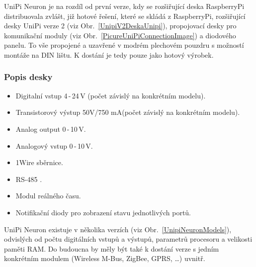UniPi Neuron je na rozdíl od první verze, kdy se rozšiřující deska RaspberryPi distribuovala zvlášt, již hotové řešení, které se skládá z RaspberryPi, rozšiřující desky UniPi verze 2 (viz Obr.~\ref{UnipiV2DeskaUnipi}), propojovací desky pro komunikační moduly (viz Obr.~\ref{PicureUniPiConnectionImage}) a diodového panelu. To vše propojené a uzavřené v modrém plechovém pouzdru s možností montáže na DIN lištu. K dostání je tedy pouze jako hotový výrobek.


\subsubsection{Popis desky}
\begin{itemize}
\item Digitalní vstup 4\,-\,24\,V (počet závislý na konkrétním modelu).
\item Transistorový výstup 50V/750 mA(počet závislý na konkrétním modelu).
\item Analog output 0\,-\,10\,V.
\item Analogový vstup 0\,-\,10\,V.
\item 1Wire sběrnice.
\item RS-485 .
\item Modul reálného času.
\item Notifikační diody pro zobrazení stavu jednotlivých portů.
\end{itemize}

UniPi Neuron existuje v několika verzích (viz Obr.~\ref{UnipiNeuronModels}), odvislých od počtu digitálních vstupů a výstupů, parametrů procesoru a velikosti paměti RAM. Do budoucna by měly být také k dostání verze s jedním konkrétním modulem (Wireless M-Bus, ZigBee, GPRS, \ldots) uvnitř.

